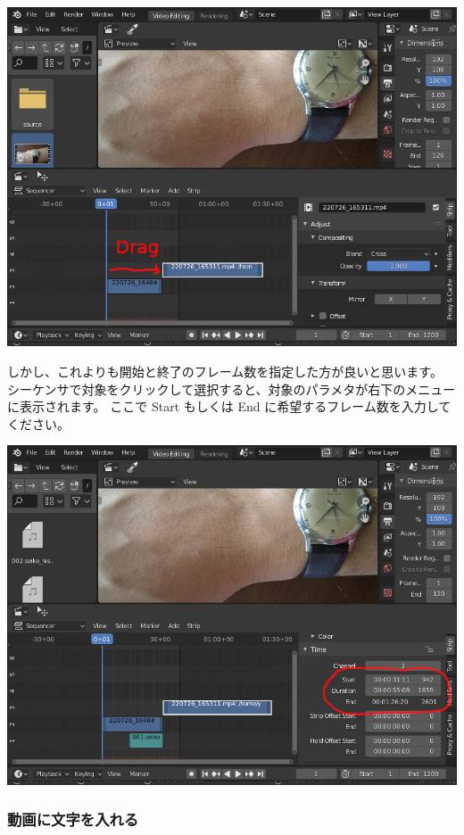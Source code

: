 \documentclass[mingoth,a4paper]{jsarticle}
\begin{document}
\begin{center}
\includegraphics[scale=0.3]{image202209/blender_change_start_frame.png}
\end{center}

しかし、これよりも開始と終了のフレーム数を指定した方が良いと思います。
シーケンサで対象をクリックして選択すると、対象のパラメタが右下のメニューに表示されます。
ここで Start もしくは End に希望するフレーム数を入力してください。

\begin{center}
\includegraphics[scale=0.3]{image202209/blender_change_time_frame.png}
\end{center}

\subsubsection{動画に文字を入れる}
\end{document}
